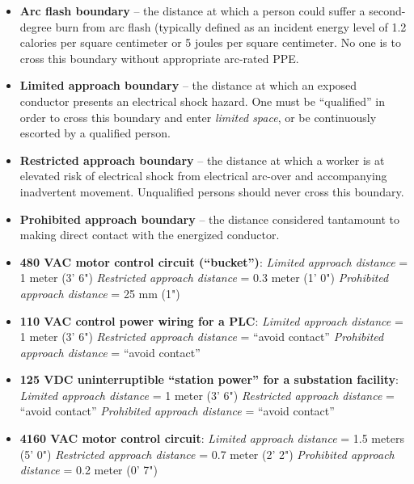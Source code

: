 





 






\begin{itemize}
\item{} {\bf Arc flash boundary} -- the distance at which a person could suffer a second-degree burn from arc flash (typically defined as an incident energy level of 1.2 calories per square centimeter or 5 joules per square centimeter.  No one is to cross this boundary without appropriate arc-rated PPE.
\item{} {\bf Limited approach boundary} -- the distance at which an exposed conductor presents an electrical shock hazard.  One must be ``qualified'' in order to cross this boundary and enter {\it limited space}, or be continuously escorted by a qualified person.
\item{} {\bf Restricted approach boundary} -- the distance at which a worker is at elevated risk of electrical shock from electrical arc-over and accompanying inadvertent movement.  Unqualified persons should never cross this boundary.
\item{} {\bf Prohibited approach boundary} -- the distance considered tantamount to making direct contact with the energized conductor.
\end{itemize}

\vskip 10pt

\filbreak

\begin{itemize}
\item{} {\bf 480 VAC motor control circuit (``bucket'')}:
\itemitem{} {\it Limited approach distance} = 1 meter (3' 6")
\itemitem{} {\it Restricted approach distance} = 0.3 meter (1' 0")
\itemitem{} {\it Prohibited approach distance} = 25 mm (1")
\vskip 2pt
\item{} {\bf 110 VAC control power wiring for a PLC}:
\itemitem{} {\it Limited approach distance} = 1 meter (3' 6")
\itemitem{} {\it Restricted approach distance} = ``avoid contact''
\itemitem{} {\it Prohibited approach distance} = ``avoid contact'' 
\vskip 2pt
\item{} {\bf 125 VDC uninterruptible ``station power'' for a substation facility}:
\itemitem{} {\it Limited approach distance} = 1 meter (3' 6")
\itemitem{} {\it Restricted approach distance} = ``avoid contact''
\itemitem{} {\it Prohibited approach distance} = ``avoid contact'' 
\vskip 2pt
\item{} {\bf 4160 VAC motor control circuit}: 
\itemitem{} {\it Limited approach distance} = 1.5 meters (5' 0")
\itemitem{} {\it Restricted approach distance} = 0.7 meter (2' 2")
\itemitem{} {\it Prohibited approach distance} = 0.2 meter (0' 7")
\end{itemize}

